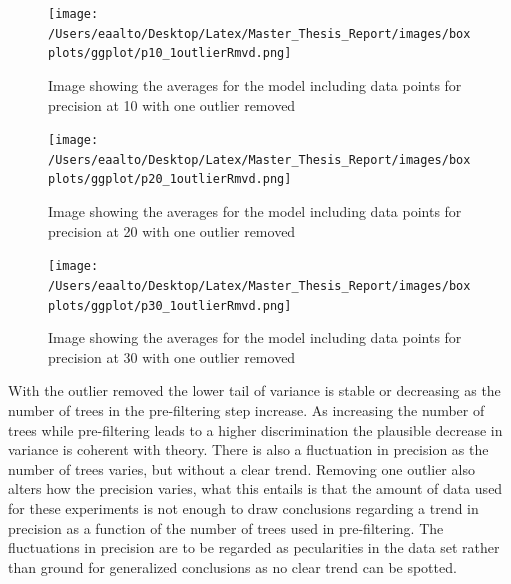 \documentclass[a4paper,11pt]{kth-mag}
\begin{document}
\begin{figure}
\centering
\texttt{[image: /Users/eaalto/Desktop/Latex/Master\_Thesis\_Report/images/boxplots/ggplot/p10\_1outlierRmvd.png]}
\caption{Image showing the averages for the model including data points for precision at 10 with one outlier removed}
\end{figure}

\begin{figure}
\centering
\texttt{[image: /Users/eaalto/Desktop/Latex/Master\_Thesis\_Report/images/boxplots/ggplot/p20\_1outlierRmvd.png]}
\caption{Image showing the averages for the model including data points for precision at 20 with one outlier removed}
\end{figure}

\begin{figure}
\centering
\texttt{[image: /Users/eaalto/Desktop/Latex/Master\_Thesis\_Report/images/boxplots/ggplot/p30\_1outlierRmvd.png]}
\caption{Image showing the averages for the model including data points for precision at 30 with one outlier removed}
\label{ilLast}
\end{figure}


With the outlier removed the lower tail of variance is stable or decreasing as the number of trees in the pre-filtering step increase. As increasing the number of trees while pre-filtering leads to a higher discrimination the plausible decrease in variance is coherent with theory. There is also a fluctuation in precision as the number of trees varies, but without a clear trend. Removing one outlier also alters how the precision varies, what this entails is that the amount of data used for these experiments is not enough to draw conclusions regarding a trend in precision as a function of the number of trees used in pre-filtering. The fluctuations in precision are to be regarded as pecularities in the data set rather than ground for generalized conclusions as no clear trend can be spotted.
\end{document}
